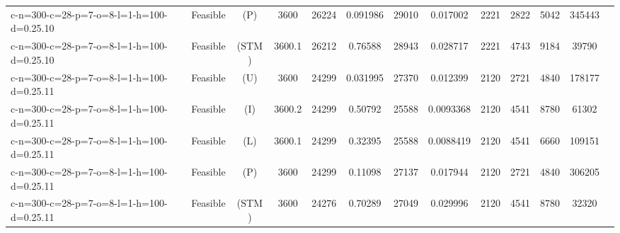 \documentclass[landscape, a4paper]{article}
\newcommand{\STM}{\ensuremath{\mathrm{STM}}}
\newcommand{\Improved}{\ensuremath{\mathrm{I}}}
\newcommand{\Loose}{\ensuremath{\mathrm{L}}}
\newcommand{\Profit}{\ensuremath{\mathrm{P}}}
\newcommand{\Utility}{\ensuremath{\mathrm{U}}}
\begin{document}
\begin{center}
\begin{tabular}{lcccccccccccc}
c-n=300-c=28-p=7-o=8-l=1-h=100-d=0.25.10 & Feasible & (\Profit) & 3600 & 26224 & 0.091986 & 29010 & 0.017002 & 2221 & 2822 & 5042 & 345443 & \\
c-n=300-c=28-p=7-o=8-l=1-h=100-d=0.25.10 & Feasible & (\STM) & 3600.1 & 26212 & 0.76588 & 28943 & 0.028717 & 2221 & 4743 & 9184 & 39790 & \\
c-n=300-c=28-p=7-o=8-l=1-h=100-d=0.25.11 & Feasible & (\Utility) & 3600 & 24299 & 0.031995 & 27370 & 0.012399 & 2120 & 2721 & 4840 & 178177 & \\
c-n=300-c=28-p=7-o=8-l=1-h=100-d=0.25.11 & Feasible & (\Improved) & 3600.2 & 24299 & 0.50792 & 25588 & 0.0093368 & 2120 & 4541 & 8780 & 61302 & \\
c-n=300-c=28-p=7-o=8-l=1-h=100-d=0.25.11 & Feasible & (\Loose) & 3600.1 & 24299 & 0.32395 & 25588 & 0.0088419 & 2120 & 4541 & 6660 & 109151 & \\
c-n=300-c=28-p=7-o=8-l=1-h=100-d=0.25.11 & Feasible & (\Profit) & 3600 & 24299 & 0.11098 & 27137 & 0.017944 & 2120 & 2721 & 4840 & 306205 & \\
c-n=300-c=28-p=7-o=8-l=1-h=100-d=0.25.11 & Feasible & (\STM) & 3600 & 24276 & 0.70289 & 27049 & 0.029996 & 2120 & 4541 & 8780 & 32320 & \\
\end{tabular}
\end{center}
\end{document}
